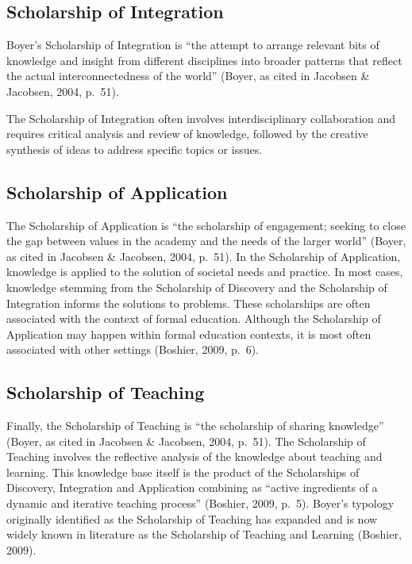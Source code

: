 \documentclass[
  letterpaper,
  DIV=11,
  numbers=noendperiod]{scrreprt}
\begin{document}
\subsection*{Scholarship of
Integration}\label{scholarship-of-integration}

Boyer's Scholarship of Integration is ``the attempt to arrange relevant
bits of knowledge and insight from different disciplines into broader
patterns that reflect the actual interconnectedness of the world''
(Boyer, as cited in Jacobsen \& Jacobsen, 2004, p.~51).

The Scholarship of Integration often involves interdisciplinary
collaboration and requires critical analysis and review of knowledge,
followed by the creative synthesis of ideas to address specific topics
or issues.

\subsection*{Scholarship of
Application}\label{scholarship-of-application}

The Scholarship of Application is ``the scholarship of engagement;
seeking to close the gap between values in the academy and the needs of
the larger world'' (Boyer, as cited in Jacobsen \& Jacobsen, 2004,
p.~51). In the Scholarship of Application, knowledge is applied to the
solution of societal needs and practice. In most cases, knowledge
stemming from the Scholarship of Discovery and the Scholarship of
Integration informs the solutions to problems. These scholarships are
often associated with the context of formal education. Although the
Scholarship of Application may happen within formal education contexts,
it is most often associated with other settings (Boshier, 2009, p.~6).

\subsection*{Scholarship of Teaching}\label{scholarship-of-teaching}

Finally, the Scholarship of Teaching is ``the scholarship of sharing
knowledge'' (Boyer, as cited in Jacobsen \& Jacobsen, 2004, p.~51). The
Scholarship of Teaching involves the reflective analysis of the
knowledge about teaching and learning. This knowledge base itself is the
product of the Scholarships of Discovery, Integration and Application
combining as ``active ingredients of a dynamic and iterative teaching
process'' (Boshier, 2009, p.~5). Boyer's typology originally identified
as the Scholarship of Teaching has expanded and is now widely known in
literature as the Scholarship of Teaching and Learning (Boshier, 2009).
\end{document}
